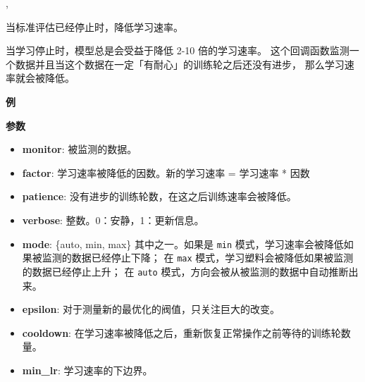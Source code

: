 \begin{Shaded}
\begin{Highlighting}[]
\OperatorTok{=}\OperatorTok{=}\OperatorTok{=}, \\
\hspace{3cm}\OperatorTok{=}\OperatorTok{=}\OperatorTok{=}\OperatorTok{=}\OperatorTok{=}\NormalTok{)}
\end{Highlighting}
\end{Shaded}

当标准评估已经停止时，降低学习速率。

当学习停止时，模型总是会受益于降低 2-10 倍的学习速率。
这个回调函数监测一个数据并且当这个数据在一定「有耐心」的训练轮之后还没有进步，
那么学习速率就会被降低。

\textbf{例}

\begin{Shaded}
\begin{Highlighting}[]
\OperatorTok{=} \OperatorTok{=}\OperatorTok{=}\NormalTok{,}
                              \OperatorTok{=}\OperatorTok{=}\NormalTok{)}
\OperatorTok{=}\NormalTok{[reduce_lr])}
\end{Highlighting}
\end{Shaded}

\textbf{参数}

\begin{itemize}
\tightlist
\item
  \textbf{monitor}: 被监测的数据。
\item
  \textbf{factor}: 学习速率被降低的因数。新的学习速率 = 学习速率 * 因数
\item
  \textbf{patience}: 没有进步的训练轮数，在这之后训练速率会被降低。
\item
  \textbf{verbose}: 整数。0：安静，1：更新信息。
\item
  \textbf{mode}: \{auto, min, max\} 其中之一。如果是 \texttt{min}
  模式，学习速率会被降低如果被监测的数据已经停止下降； 在 \texttt{max}
  模式，学习塑料会被降低如果被监测的数据已经停止上升； 在 \texttt{auto}
  模式，方向会被从被监测的数据中自动推断出来。
\item
  \textbf{epsilon}: 对于测量新的最优化的阀值，只关注巨大的改变。
\item
  \textbf{cooldown}:
  在学习速率被降低之后，重新恢复正常操作之前等待的训练轮数量。
\item
  \textbf{min\_lr}: 学习速率的下边界。
\end{itemize}



